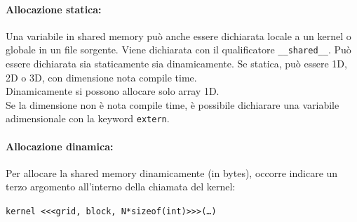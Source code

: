 \paragraph{Allocazione statica:} Una variabile in shared memory può anche essere dichiarata locale a un kernel o globale in un file sorgente. Viene dichiarata con il qualificatore \texttt{\_\_shared\_\_}. Può essere dichiarata sia staticamente sia dinamicamente. Se statica, può essere 1D, 2D o 3D, con dimensione nota compile time.\\
Dinamicamente si possono allocare solo array 1D.\\

Se la dimensione non è nota compile time, è possibile dichiarare una variabile adimensionale con la keyword \texttt{extern}.\\

\paragraph{Allocazione dinamica:} Per allocare la shared memory dinamicamente (in bytes), occorre indicare un terzo argomento all'interno della chiamata del kernel:
\begin{center}
	\texttt{kernel <<<grid, block, N*sizeof(int)>>>(\dots)}
\end{center}

